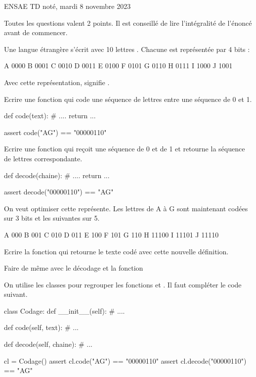 %

\huge ENSAE TD noté, mardi 8 novembre 2023 \normalsize

Toutes les questions valent 2 points. Il est conseillé de lire l'intégralité de l'énoncé avant de commencer.

\exosubject{}
\begin{xexercice}\label{td_note_label4_2023}

Une langue étrangère s'écrit avec 10 lettres . Chacune est représentée par 4 bits :

\begin{verbatimx}
A 0000
B 0001
C 0010
D 0011
E 0100
F 0101
G 0110
H 0111
I 1000
J 1001
\end{verbatimx}

Avec cette représentation,  signifie .

\exequest Ecrire une fonction qui code une séquence de lettres entre une séquence de 0 et 1.

\begin{verbatimx}
def code(text):
    # ....
    return ...

assert code("AG") == "00000110"
\end{verbatimx}

\exequest Ecrire une fonction qui reçoit une séquence de 0 et de 1 et retourne la séquence de lettres correspondante.

\begin{verbatimx}
def decode(chaine):
    # ....
    return ...

assert decode("00000110") == "AG"
\end{verbatimx}

\exequest On veut optimiser cette représente. Les lettres de A à G sont maintenant codées sur 3 bits et les suivantes sur 5.

\begin{verbatimx}
A 000
B 001
C 010
D 011
E 100
F 101
G 110
H 11100
I 11101
J 11110
\end{verbatimx}
 
Ecrire la fonction  qui retourne le texte codé avec cette nouvelle définition.

\exequest Faire de même avec le décodage et la fonction 

\exequest On utilise les classes pour regrouper les fonctions  et . Il faut compléter le code suivant.

\begin{verbatimx}
class Codage:
    def __init__(self):
        # ....

    def code(self, text):
        # ...

    def decode(self, chaine):
        # ...

cl = Codage()
assert cl.code("AG") == "00000110"
assert cl.decode("00000110") == "AG"
\end{verbatimx}
\end{xexercice}


